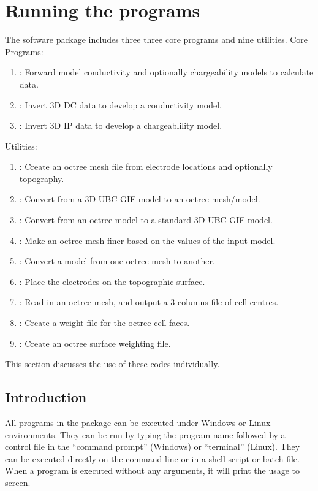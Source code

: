 \section{Running the programs}

The software package \programName includes three three core programs and nine utilities.
Core Programs:
\begin{enumerate}
\item {}: Forward model conductivity and optionally chargeability models
to calculate data.
\item {}: Invert 3D DC data to develop a conductivity model.
\item {}: Invert 3D IP data to develop a chargeablility model.
\end{enumerate}

Utilities:
\begin{enumerate}
\item {}: Create an octree mesh file from electrode locations and optionally
topography.
\item {}: Convert from a 3D UBC-GIF model to an octree mesh/model.
\item {}: Convert from an octree model to a standard 3D UBC-GIF model.
\item {}: Make an octree mesh finer based on the values of the input model.
\item {}: Convert a model from one octree mesh to another.
\item {}: Place the electrodes on the topographic surface.
\item {}: Read in an octree mesh, and output a 3-columns file of cell centres.
\item {}: Create a weight file for the octree cell faces.
\item {}: Create an octree surface weighting file.
\end{enumerate}
This section discusses the use of these codes individually.

\subsection{Introduction}
All programs in the package can be executed under Windows or Linux environments. They can be run by typing the program name followed by a control file in the ``command prompt'' (Windows) or ``terminal'' (Linux). They can be executed directly on the command line or in a shell script or batch file. When a program is executed without any arguments, it will print the usage to screen.

